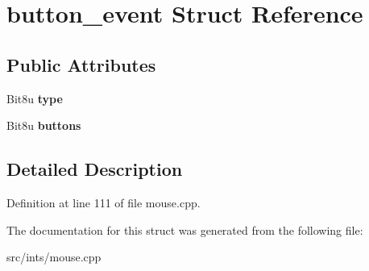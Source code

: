 \hypertarget{structbutton__event}{\section{button\-\_\-event Struct Reference}
\label{structbutton__event}
}
\subsection*{Public Attributes}
\begin{DoxyCompactItemize}
\item 
\hypertarget{structbutton__event_a793d0b44cf9339bd85bd3d571830fa51}{Bit8u {\bfseries type}}\label{structbutton__event_a793d0b44cf9339bd85bd3d571830fa51}

\item 
\hypertarget{structbutton__event_abacaa182c19fa91de5e17ee325f6fe88}{Bit8u {\bfseries buttons}}\label{structbutton__event_abacaa182c19fa91de5e17ee325f6fe88}

\end{DoxyCompactItemize}


\subsection{Detailed Description}


Definition at line 111 of file mouse.\-cpp.



The documentation for this struct was generated from the following file\-:\begin{DoxyCompactItemize}
\item 
src/ints/mouse.\-cpp\end{DoxyCompactItemize}
